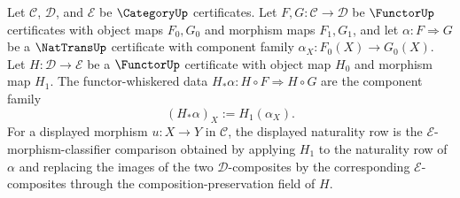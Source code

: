 \begin{definition}
\label{def:functor-whiskered-nattrans-certificate-data}
Let $\mathcal C$, $\mathcal D$, and $\mathcal E$ be $\CategoryUp$ certificates. Let $F,G:\mathcal C\to\mathcal D$ be $\FunctorUp$ certificates with object maps $F_0,G_0$ and morphism maps $F_1,G_1$, and let $\alpha:F\Rightarrow G$ be a $\NatTransUp$ certificate with component family $\alpha_X:F_0(X)\to G_0(X)$. Let $H:\mathcal D\to\mathcal E$ be a $\FunctorUp$ certificate with object map $H_0$ and morphism map $H_1$. The functor-whiskered data $H_{\ast}\alpha:H\circ F\Rightarrow H\circ G$ are the component family
$$
(H_{\ast}\alpha)_X:=H_1(\alpha_X).
$$
For a displayed morphism $u:X\to Y$ in $\mathcal C$, the displayed naturality row is the $\mathcal E$-morphism-classifier comparison obtained by applying $H_1$ to the naturality row of $\alpha$ and replacing the images of the two $\mathcal D$-composites by the corresponding $\mathcal E$-composites through the composition-preservation field of $H$.
\end{definition}

